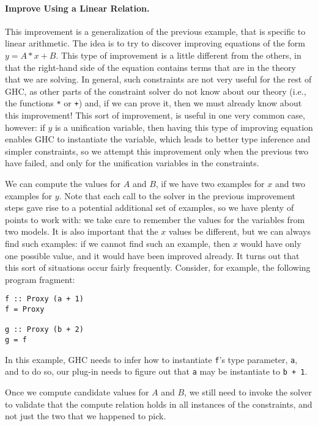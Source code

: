 \documentclass{sigplanconf}
\begin{document}
\paragraph{Improve Using a Linear Relation.}
This improvement is a generalization of the previous example, that
is specific to linear arithmetic.  The idea is to try to discover
improving equations of the form $y = A * x + B$.  This type of
improvement is a little different from the others, in that the right-hand
side of the equation contains terms that are in the theory that we are solving.
In general, such constraints are not very useful for the rest of GHC,
as other parts of the constraint solver do not know about our theory
(i.e., the functions \Verb"*" or \Verb"+") and, if we can prove it, then
we must already know about this improvement!  This sort of improvement, is
useful in one very common case, however:  if $y$ is a unification variable,
then having this type of improving equation enables GHC to instantiate
the variable, which leads to better type inference and simpler constraints,
so we attempt this improvement only when the previous two have failed,
and only for the unification variables in the constraints.

We can compute the values for $A$ and $B$, if we have two examples for
$x$ and two examples for $y$. Note that each call to the solver in
the previous improvement steps gave rise to a potential additional set
of examples, so we have plenty of points to work with: we take care to
remember the values for the variables from two models.   It is also
important that the $x$ values be different, but we can always find such
examples: if we cannot find such an example, then $x$ would have only
one possible value, and it would have been improved already.  It turns
out that this sort of situations occur fairly frequently.  Consider,
for example, the following program fragment:
\begin{Verbatim}
f :: Proxy (a + 1)
f = Proxy

g :: Proxy (b + 2)
g = f
\end{Verbatim}
In this example, GHC needs to infer how to instantiate \Verb"f"'s type
parameter, \Verb"a", and to do so, our plug-in needs to figure out that
\Verb"a" may be instantiate to \Verb"b + 1".

Once we compute candidate values for $A$ and $B$, we still need to
invoke the solver to validate that the compute relation holds in all
instances of the constraints, and not just the two that we happened to pick.
\end{document}
